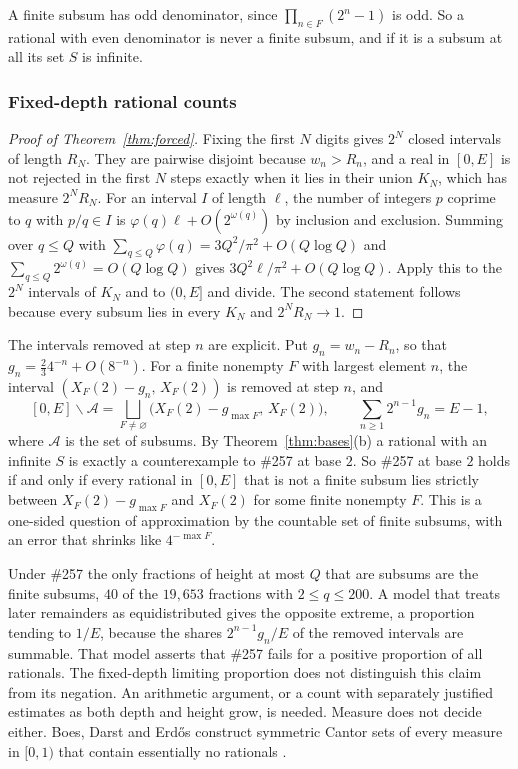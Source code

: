 \documentclass[11pt]{article}
\begin{document}
A finite subsum has odd denominator, since $\prod_{n\in F}(2^n-1)$ is odd.  So a
rational with even denominator is never a finite subsum, and if it is a subsum
at all its set $S$ is infinite.


\subsubsection{Fixed-depth rational counts}


\begin{proof}[Proof of Theorem~\ref{thm:forced}]
Fixing the first $N$ digits gives $2^N$ closed intervals of length $R_N$.
They are pairwise disjoint because $w_n>R_n$, and a real in $[0,E]$ is not
rejected in the first $N$ steps exactly when it lies in their union $K_N$,
which has measure $2^NR_N$.  For an interval $I$ of length $\ell$, the number
of integers $p$ coprime to $q$ with $p/q\in I$ is
$\varphi(q)\ell+O(2^{\omega(q)})$ by inclusion and exclusion.  Summing over
$q\le Q$ with $\sum_{q\le Q}\varphi(q)=3Q^2/\pi^2+O(Q\log Q)$ and
$\sum_{q\le Q}2^{\omega(q)}=O(Q\log Q)$ gives $3Q^2\ell/\pi^2+O(Q\log Q)$.
Apply this to the $2^N$ intervals of $K_N$ and to $(0,E]$ and divide.  The
second statement follows because every subsum lies in every $K_N$ and
$2^NR_N\to1$.
\end{proof}

The intervals removed at step $n$ are explicit.  Put $g_n=w_n-R_n$, so that
$g_n=\tfrac23 4^{-n}+O(8^{-n})$.  For a finite nonempty $F$ with largest element
$n$, the interval $(X_F(2)-g_n,\,X_F(2))$ is removed at step $n$, and
\[
 [0,E]\smallsetminus\mathcal A=\bigsqcup_{F\ne\varnothing}\bigl(X_F(2)-g_{\max F},\,X_F(2)\bigr),
 \qquad\sum_{n\ge1}2^{n-1}g_n=E-1,
\]
where $\mathcal A$ is the set of subsums.  By Theorem~\ref{thm:bases}(b) a
rational with an infinite $S$ is exactly a counterexample to \#257 at base $2$.
So \#257 at base $2$ holds if and only if every rational in $[0,E]$ that is not
a finite subsum lies strictly between $X_F(2)-g_{\max F}$ and $X_F(2)$ for some
finite nonempty $F$.
This is a one-sided question of approximation by the countable set of finite
subsums, with an error that shrinks like $4^{-\max F}$.

Under \#257 the only fractions of height at most $Q$ that are subsums are the
finite subsums, $40$ of the $19{,}653$ fractions with $2\le q\le200$.  A model
that treats later remainders as equidistributed gives the opposite extreme, a
proportion tending to $1/E$, because the shares $2^{n-1}g_n/E$ of the removed
intervals are summable.  That model asserts that \#257 fails for a
positive proportion of all rationals.  The fixed-depth limiting proportion does
not distinguish this claim from its negation.  An arithmetic argument, or a
count with separately justified estimates as both depth and height grow, is needed.
Measure does not decide either.  Boes, Darst and Erd\H{o}s construct symmetric
Cantor sets of every measure in $[0,1)$ that contain essentially no rationals
\cite{boesdarsterdos1981}.
\end{document}

